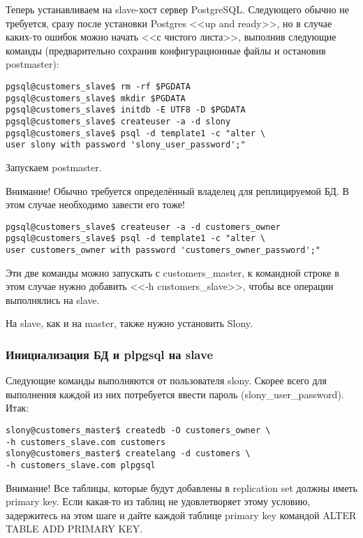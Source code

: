 Теперь устанавливаем на slave-хост сервер PostgreSQL. Следующего обычно не требуется, сразу после установки Postgres
<<up and ready>>, но в случае каких-то ошибок можно начать <<с чистого листа>>, выполнив следующие команды
(предварительно сохранив конфигурационные файлы и остановив postmaster):
\begin{lstlisting}[label=lst:slony4,caption=Подготовка одного slave-сервера]
pgsql@customers_slave$ rm -rf $PGDATA
pgsql@customers_slave$ mkdir $PGDATA
pgsql@customers_slave$ initdb -E UTF8 -D $PGDATA
pgsql@customers_slave$ createuser -a -d slony
pgsql@customers_slave$ psql -d template1 -c "alter \
user slony with password 'slony_user_password';"
\end{lstlisting}

Запускаем postmaster.

Внимание! Обычно требуется определённый владелец для реплицируемой БД. В этом случае необходимо завести его тоже!
\begin{lstlisting}[label=lst:slony5,caption=Подготовка одного slave-сервера]
pgsql@customers_slave$ createuser -a -d customers_owner
pgsql@customers_slave$ psql -d template1 -c "alter \
user customers_owner with password 'customers_owner_password';"
\end{lstlisting}

Эти две команды можно запускать с customers\_master, к командной строке в этом случае нужно добавить
<<-h customers\_slave>>, чтобы все операции выполнялись на slave.

На slave, как и на master, также нужно установить Slony.

\subsubsection{Инициализация БД и plpgsql на slave}

Следующие команды выполняются от пользователя slony. Скорее всего для выполнения каждой из них потребуется
ввести пароль (slony\_user\_password). Итак:
\begin{lstlisting}[label=lst:slony6,caption=Инициализация БД и plpgsql на slave]
slony@customers_master$ createdb -O customers_owner \
-h customers_slave.com customers
slony@customers_master$ createlang -d customers \
-h customers_slave.com plpgsql
\end{lstlisting}

Внимание! Все таблицы, которые будут добавлены в replication set должны иметь primary key.
Если какая-то из таблиц не удовлетворяет этому условию, задержитесь на этом шаге и дайте каждой таблице primary key
командой ALTER TABLE ADD PRIMARY KEY.

